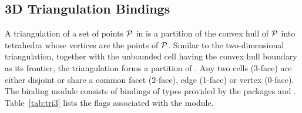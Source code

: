 \subsection{3D Triangulation Bindings}
\label{ssec:modules:tri3}
A triangulation of a set of points ${\cal P}$ in \Rthree is a partition
of the convex hull of ${\cal P}$ into tetrahedra whose vertices are the
points of ${\cal P}$. Similar to the two-dimensional triangulation,
together with the unbounded cell having the convex hull boundary as
its frontier, the triangulation forms a partition of \Rthree. Any two
cells (3-face) are either disjoint or share a common facet (2-face),
edge (1-face) or vertex (0-face).  The binding module
\iiiDTriangulationsPackage{} consists of bindings of types provided by
the \cgal{} packages \iiiDTriangulationsPackage{} and
\iiiDPeriodicTriangulationsPackage{}. Table~\ref{tab:tri3} lists the
\cmake{} flags associated with the \iiiDTriangulationsPackage{}
module.

\begin{table}[!htp]
  \caption{\iiiDTriangulationsPackage{} module flags.}
  \centering{}
  \label{tab:tri3}
\end{table}

